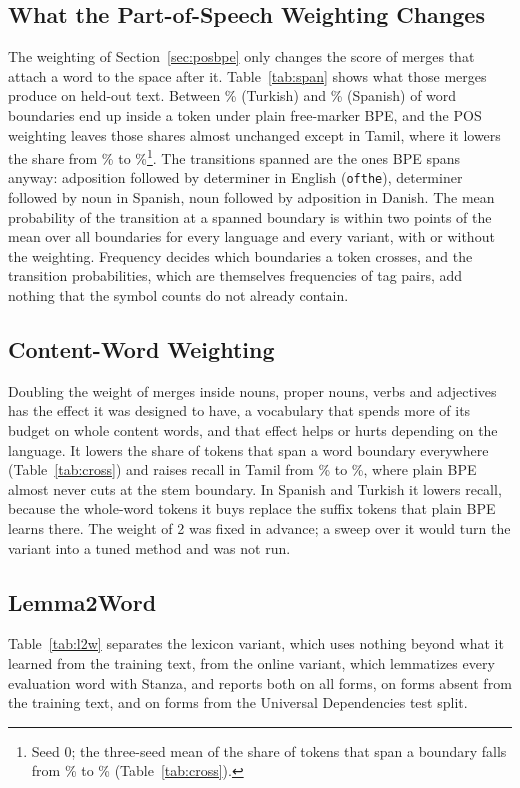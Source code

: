 \subsection{What the Part-of-Speech Weighting Changes}\label{sec:res-pos}
The weighting of Section~\ref{sec:posbpe} only changes the score of merges that attach a word to the space after it.
Table~\ref{tab:span} shows what those merges produce on held-out text.
Between \nSpanShareBpeTurkish\% (Turkish) and \nSpanShareBpeSpanish\% (Spanish) of word boundaries end up inside a token under plain free-marker BPE, and the POS weighting leaves those shares almost unchanged except in Tamil, where it lowers the share from \nSpanShareBpeTamil\% to \nSpanSharePosTamil\%\footnote{Seed 0; the three-seed mean of the share of tokens that span a boundary falls from \nCrossBpeTamil\% to \nCrossPosTamil\% (Table~\ref{tab:cross}).}.
The transitions spanned are the ones BPE spans anyway: adposition followed by determiner in English (\texttt{of\textvisiblespace the\textvisiblespace}), determiner followed by noun in Spanish, noun followed by adposition in Danish.
The mean probability of the transition at a spanned boundary is within two points of the mean over all boundaries for every language and every variant, with or without the weighting.
Frequency decides which boundaries a token crosses, and the transition probabilities, which are themselves frequencies of tag pairs, add nothing that the symbol counts do not already contain.



\subsection{Content-Word Weighting}\label{sec:res-content}
Doubling the weight of merges inside nouns, proper nouns, verbs and adjectives has the effect it was designed to have, a vocabulary that spends more of its budget on whole content words, and that effect helps or hurts depending on the language.
It lowers the share of tokens that span a word boundary everywhere (Table~\ref{tab:cross}) and raises recall in Tamil from \nRBpeTamil\% to \nRPosContentTamil\%, where plain BPE almost never cuts at the stem boundary.
In Spanish and Turkish it lowers recall, because the whole-word tokens it buys replace the suffix tokens that plain BPE learns there.
The weight of 2 was fixed in advance; a sweep over it would turn the variant into a tuned method and was not run.

\subsection{Lemma2Word}\label{sec:res-l2w}
Table~\ref{tab:l2w} separates the lexicon variant, which uses nothing beyond what it learned from the training text, from the online variant, which lemmatizes every evaluation word with Stanza, and reports both on all forms, on forms absent from the training text, and on forms from the Universal Dependencies test split.

